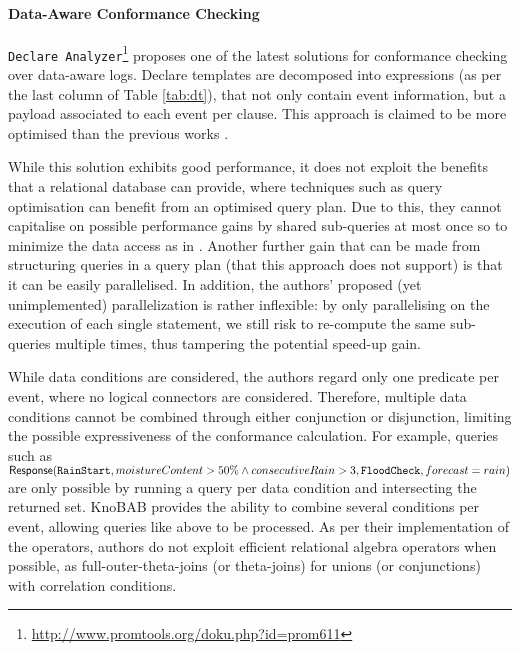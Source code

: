 \paragraph*{Data-Aware Conformance Checking}
\texttt{Declare Analyzer}\footnote{\url{http://www.promtools.org/doku.php?id=prom611}} \cite{BurattinMS16} proposes one of the latest solutions for conformance checking over data-aware logs. Declare templates are decomposed into \LTLf expressions (as per the last column of Table \ref{tab:dt}), that not only contain event information, but a payload associated to each event per clause. %
This approach is claimed to be  more optimised than the previous works \cite{VanDerAalst2005}.%

While this solution exhibits good performance, it does not exploit the benefits that a relational database can provide, where techniques such as query optimisation can benefit from an optimised query plan. Due to this, they cannot capitalise on possible performance gains by shared sub-queries at most once so to minimize the data access as in \cite{BellatrecheKB21}. Another further gain that can be made from structuring queries in a query plan (that this approach does not support) is that it can be easily parallelised. In addition, the authors' proposed (yet unimplemented) parallelization is rather inflexible: by only parallelising on the execution of each single statement, we still risk to re-compute the same sub-queries multiple times, thus tampering the potential speed-up gain.

While data conditions are considered, the authors regard only one predicate per event, where no logical connectors are considered. Therefore, multiple data conditions cannot be combined through either conjunction or disjunction, limiting the possible expressiveness of the conformance calculation. For example, queries such as 
$\textsf{Response}(\texttt{RainStart},moistureContent\\>50\% \wedge consecutiveRain>3,\texttt{FloodCheck},forecast=rain)$ 
are only possible by running a query per data condition and intersecting the returned set. KnoBAB provides the ability to combine several conditions per event, allowing queries like above to be processed. As per their implementation of the \LTLf operators, authors do not exploit efficient relational algebra operators when possible, as full-outer-theta-joins (or theta-joins) for unions (or conjunctions) with correlation conditions.

